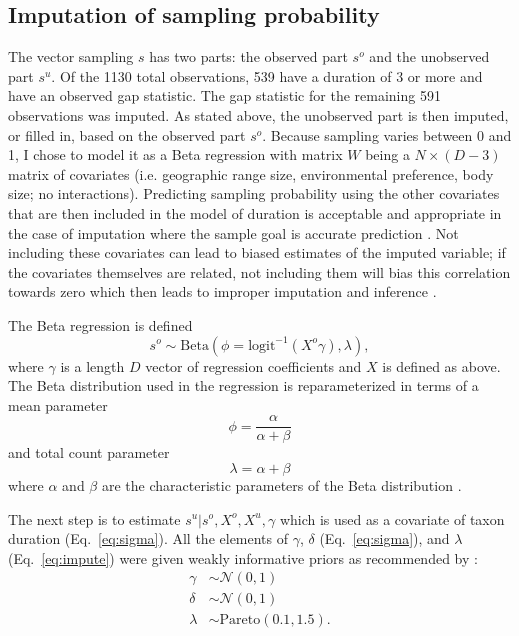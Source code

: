 \documentclass[11pt]{article}
\begin{document}
\subsection*{Imputation of sampling probability}
The vector sampling \(s\) has two parts: the observed part \(s^{o}\) and the unobserved part \(s^{u}\). Of the 1130 total observations, 539 have a duration of 3 or more and have an observed gap statistic. The gap statistic for the remaining 591 observations was imputed. As stated above, the unobserved part is then imputed, or filled in, based on the observed part \(s^{o}\). Because sampling varies between 0 and 1, I chose to model it as a Beta regression with matrix \(W\) being a \(N \times (D - 3)\) matrix of covariates (i.e. geographic range size, environmental preference, body size; no interactions). Predicting sampling probability using the other covariates that are then included in the model of duration is acceptable and appropriate in the case of imputation where the sample goal is accurate prediction \citep{Rubin1996,Gelman2007}. Not including these covariates can lead to biased estimates of the imputed variable; if the covariates themselves are related, not including them will bias this correlation towards zero which then leads to improper imputation and inference \citep{Rubin1996}.

The Beta regression is defined
\begin{equation}
  s^{o} \sim \mathrm{Beta}(\phi = \text{logit}^{-1}(X^{o} \gamma), \lambda),
  \label{eq:impute}
\end{equation}
where \(\gamma\) is a length \(D\) vector of regression coefficients and \(X\) is defined as above. The Beta distribution used in the regression is reparameterized in terms of a mean parameter
\begin{equation}
  \phi = \frac{\alpha}{\alpha + \beta}
\end{equation}
and total count parameter
\begin{equation}
  \lambda = \alpha + \beta
\end{equation}
where \(\alpha\) and \(\beta\) are the characteristic parameters of the Beta distribution \citep{Gelman2013d}.

The next step is to estimate \(s^{u} | s^{o}, X^{o}, X^{u}, \gamma\) which is used as a covariate of taxon duration (Eq.~\ref{eq:sigma}). All the elements of \(\gamma\), \(\delta\) (Eq.~\ref{eq:sigma}), and \(\lambda\) (Eq.~\ref{eq:impute}) were given weakly informative priors as recommended by \citet{StanManual}:
\begin{equation}
  \begin{aligned}
    \gamma &\sim \mathcal{N}(0, 1) \\
    \delta &\sim \mathcal{N}(0, 1) \\
    \lambda &\sim \mathrm{Pareto}(0.1, 1.5). \\
  \end{aligned}
\end{equation}
\end{document}
